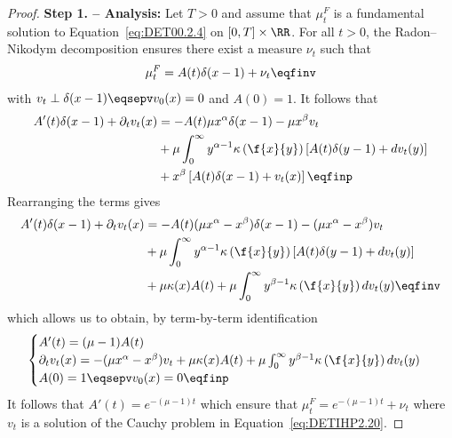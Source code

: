 \begin{proof}
\textbf{Step 1. -- Analysis:} Let $T > 0$ and assume that $\mu_t^F$ is a fundamental solution to Equation~\eqref{eq:DET00.2.4} on $[0,T]\times \RR$. For all $t> 0$, the Radon--Nikodym decomposition ensures there exist a measure $\nu_t$ such that
    \begin{align*}
        \mu_t^F = A(t) \delta(x-1) + \nu_t \eqfinv
    \end{align*}
with $v_t \perp \delta(x-1) \eqsepv v_0(x) = 0$ and $A(0) = 1$. 
It follows that 
\begin{align*}
    A'(t) \delta(x-1) + \partial_t v_t(x)
    &= 
    - A(t) \mu x^{\alpha} \delta(x-1) 
    - \mu x^\beta v_t \\
    &+ \mu \int_0^\infty y^{\alpha -1} \kappa \left( \f{x}{y}\right)\left[ A(t) \delta(y-1) + dv_t(y) \right] \\
    &+ x^\beta \left[ A(t) \delta(x-1) + v_t(x)\right]
    \eqfinp
\end{align*}
Rearranging the terms gives 
\begin{align*}
    A'(t) \delta(x-1) + \partial_t v_t(x)
    &= 
    - A(t) (\mu x^{\alpha} - x^\beta) \delta(x-1) 
    - (\mu x^{\alpha} - x^\beta) v_t \\
    &+ \mu \int_0^\infty y^{\alpha -1} \kappa \left( \f{x}{y}\right)\left[ A(t) \delta(y-1) + dv_t(y) \right] \\
    &+ \mu\kappa(x) A(t)  + \mu \int_0^\infty y^{\beta-1} \kappa \left( \f{x}{y} \right) dv_t(y)
    \eqfinv
\end{align*}
which allows us to obtain, by term-by-term identification
\begin{align}
\begin{cases}
    A'(t) =  (\mu - 1) A(t)\\
    \partial_t v_t(x) = - (\mu x^{\alpha} - x^\beta) v_t + \mu\kappa(x) A(t)  + \mu \int_0^\infty y^{\beta-1} \kappa \left( \f{x}{y} \right) dv_t(y) \\
    A(0) = 1 \eqsepv v_0(x) = 0 \eqfinp
    \label{eq:DETIHP2.20}
\end{cases} 
\end{align}
It follows that $A'(t) = e^{-(\mu-1)t}$ which ensure that $\mu_t^F = e^{-(\mu-1)t} + \nu_t$ where $v_t$ is a solution of the Cauchy problem in Equation~\eqref{eq:DETIHP2.20}.     


\end{proof}
